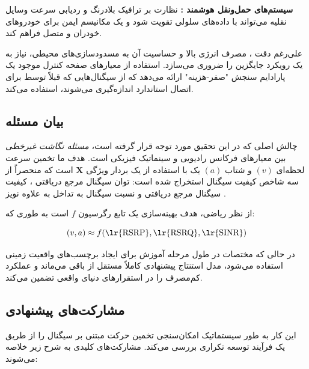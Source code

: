 \documentclass{CSICC}
\begin{document}
\textbf{سیستم‌های حمل‌ونقل هوشمند :} نظارت بر ترافیک بلادرنگ و ردیابی سرعت وسایل نقلیه می‌تواند با داده‌های سلولی تقویت شود و یک مکانیسم ایمن برای خودروهای خودران و متصل فراهم کند.

علی‌رغم دقت ، مصرف انرژی بالا و حساسیت آن به مسدودسازی‌های محیطی، نیاز به یک رویکرد جایگزین را ضروری می‌سازد. استفاده از معیارهای صفحه کنترل  موجود یک پارادایم سنجش "صفر-هزینه" ارائه می‌دهد که از سیگنال‌هایی که قبلاً توسط  برای اتصال استاندارد اندازه‌گیری می‌شوند، استفاده می‌کند.

\subsection{بیان مسئله}
چالش اصلی که در این تحقیق مورد توجه قرار گرفته است، \textit{مسئله نگاشت غیرخطی} بین معیارهای فرکانس رادیویی  و سینماتیک فیزیکی است. هدف ما تخمین سرعت لحظه‌ای \((v)\) و شتاب \((a)\) یک  با استفاده از یک بردار ویژگی \(\mathbf{X}\) است که منحصراً از سه شاخص کیفیت سیگنال استخراج شده است: توان سیگنال مرجع دریافتی ، کیفیت سیگنال مرجع دریافتی  و نسبت سیگنال به تداخل به علاوه نویز .

از نظر ریاضی، هدف بهینه‌سازی یک تابع رگرسیون \(f\) است به طوری که:

\[
(v,a)\approx f(\text{\lr{RSRP}},\text{\lr{RSRQ}},\text{\lr{SINR}})
\]

در حالی که مختصات  در طول مرحله آموزش برای ایجاد برچسب‌های واقعیت زمینی استفاده می‌شود، مدل استنتاج پیشنهادی کاملاً مستقل از  باقی می‌ماند و عملکرد کم‌مصرف را در استقرارهای دنیای واقعی تضمین می‌کند.

\subsection{مشارکت‌های پیشنهادی}
این کار به طور سیستماتیک امکان‌سنجی تخمین حرکت مبتنی بر سیگنال را از طریق یک فرآیند توسعه تکراری بررسی می‌کند. مشارکت‌های کلیدی به شرح زیر خلاصه می‌شوند:
\end{document}
